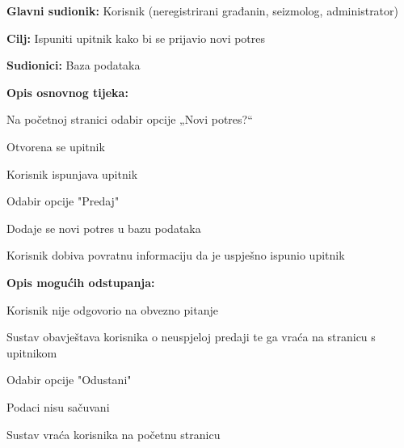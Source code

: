 			\noindent {}
			\begin{packed_item}
				
				\item \textbf{Glavni sudionik:} Korisnik (neregistrirani građanin, seizmolog, administrator)
				\item \textbf{Cilj:} Ispuniti upitnik kako bi se prijavio novi potres
				\item \textbf{Sudionici:} Baza podataka
				
				\item \textbf{Opis osnovnog tijeka:}
				
				\item[] \begin{packed_enum}
					\item Na početnoj stranici odabir opcije „Novi potres?“
					\item Otvorena se upitnik
					\item Korisnik ispunjava upitnik
					\item Odabir opcije "Predaj"
					\item Dodaje se novi potres u bazu podataka
					\item Korisnik dobiva povratnu informaciju da je uspješno ispunio upitnik
				\end{packed_enum}
				
				\item  \textbf{Opis mogućih odstupanja:}
				
				\item[] \begin{packed_item}
					
					\item[3.a] Korisnik nije odgovorio na obvezno pitanje
					\item[] \begin{packed_enum}
						
						\item Sustav obavještava korisnika o neuspjeloj predaji te ga vraća na stranicu s upitnikom						
					\end{packed_enum}
					
					\item[4.a] Odabir opcije "Odustani"
					\item[] \begin{packed_enum}
						
						\item Podaci nisu sačuvani
						\item Sustav vraća korisnika na početnu stranicu						
					\end{packed_enum}
					
				\end{packed_item}
				
			\end{packed_item}
			
